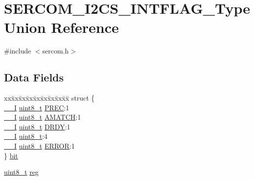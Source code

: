 \hypertarget{union_s_e_r_c_o_m___i2_c_s___i_n_t_f_l_a_g___type}{}\section{S\+E\+R\+C\+O\+M\+\_\+\+I2\+C\+S\+\_\+\+I\+N\+T\+F\+L\+A\+G\+\_\+\+Type Union Reference}
\label{union_s_e_r_c_o_m___i2_c_s___i_n_t_f_l_a_g___type}


{\ttfamily \#include $<$sercom.\+h$>$}

\subsection*{Data Fields}
\begin{DoxyCompactItemize}
\item 
\begin{tabbing}
xx\=xx\=xx\=xx\=xx\=xx\=xx\=xx\=xx\=\kill
struct \{\\
\>\mbox{\hyperlink{core__cm0plus_8h_af63697ed9952cc71e1225efe205f6cd3}{\_\_I}} \mbox{\hyperlink{union_s_e_r_c_o_m___i2_c_s___i_n_t_f_l_a_g___type_a5b4208c6f4c4a4290c4f2804d1eb1d5b}{uint8\_t}} \mbox{\hyperlink{union_s_e_r_c_o_m___i2_c_s___i_n_t_f_l_a_g___type_a621168cf741d57ad708e138a725eb1ae}{PREC}}:1\\
\>\mbox{\hyperlink{core__cm0plus_8h_af63697ed9952cc71e1225efe205f6cd3}{\_\_I}} \mbox{\hyperlink{union_s_e_r_c_o_m___i2_c_s___i_n_t_f_l_a_g___type_a5b4208c6f4c4a4290c4f2804d1eb1d5b}{uint8\_t}} \mbox{\hyperlink{union_s_e_r_c_o_m___i2_c_s___i_n_t_f_l_a_g___type_a3ac56de71337a2c2dba19a3b60424efa}{AMATCH}}:1\\
\>\mbox{\hyperlink{core__cm0plus_8h_af63697ed9952cc71e1225efe205f6cd3}{\_\_I}} \mbox{\hyperlink{union_s_e_r_c_o_m___i2_c_s___i_n_t_f_l_a_g___type_a5b4208c6f4c4a4290c4f2804d1eb1d5b}{uint8\_t}} \mbox{\hyperlink{union_s_e_r_c_o_m___i2_c_s___i_n_t_f_l_a_g___type_a8c6bcd183282d4f0f5468330b463702f}{DRDY}}:1\\
\>\mbox{\hyperlink{core__cm0plus_8h_af63697ed9952cc71e1225efe205f6cd3}{\_\_I}} \mbox{\hyperlink{union_s_e_r_c_o_m___i2_c_s___i_n_t_f_l_a_g___type_a5b4208c6f4c4a4290c4f2804d1eb1d5b}{uint8\_t}}:4\\
\>\mbox{\hyperlink{core__cm0plus_8h_af63697ed9952cc71e1225efe205f6cd3}{\_\_I}} \mbox{\hyperlink{union_s_e_r_c_o_m___i2_c_s___i_n_t_f_l_a_g___type_a5b4208c6f4c4a4290c4f2804d1eb1d5b}{uint8\_t}} \mbox{\hyperlink{union_s_e_r_c_o_m___i2_c_s___i_n_t_f_l_a_g___type_ab083f63120ce20369e2dbb0081da16e3}{ERROR}}:1\\
\} \mbox{\hyperlink{union_s_e_r_c_o_m___i2_c_s___i_n_t_f_l_a_g___type_ab864f4be3efaad41c59d481acfa28426}{bit}}\\

\end{tabbing}\item 
\mbox{\hyperlink{union_s_e_r_c_o_m___i2_c_s___i_n_t_f_l_a_g___type_a5b4208c6f4c4a4290c4f2804d1eb1d5b}{uint8\+\_\+t}} \mbox{\hyperlink{union_s_e_r_c_o_m___i2_c_s___i_n_t_f_l_a_g___type_a9428adc9af4653a2050e2536b55dec8d}{reg}}
\end{DoxyCompactItemize}



